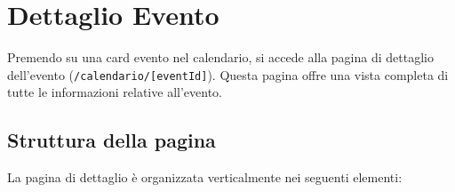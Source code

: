 \documentclass[a4paper,11pt,oneside]{book}
\newcommand{\percorso}[1]{\textcolor{namoCyan}{\texttt{#1}}}
\begin{document}
\section{Dettaglio Evento}
\label{sec:dettaglio-evento}

Premendo su una card evento nel calendario, si accede alla pagina di dettaglio dell'evento (\percorso{/calendario/[eventId]}). Questa pagina offre una vista completa di tutte le informazioni relative all'evento.

\subsection{Struttura della pagina}

La pagina di dettaglio \`e organizzata verticalmente nei seguenti elementi:
\end{document}
